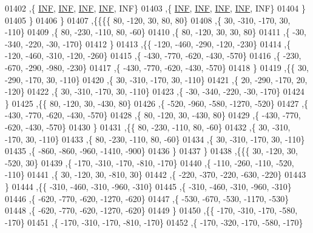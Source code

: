 \begin{DoxyCode}
01402     ,\{   \hyperlink{constants_8h_a12c2040f25d8e3a7b9e1c2024c618cb6}{INF},   \hyperlink{constants_8h_a12c2040f25d8e3a7b9e1c2024c618cb6}{INF},   \hyperlink{constants_8h_a12c2040f25d8e3a7b9e1c2024c618cb6}{INF},   \hyperlink{constants_8h_a12c2040f25d8e3a7b9e1c2024c618cb6}{INF},   INF\}
01403     ,\{   \hyperlink{constants_8h_a12c2040f25d8e3a7b9e1c2024c618cb6}{INF},   \hyperlink{constants_8h_a12c2040f25d8e3a7b9e1c2024c618cb6}{INF},   \hyperlink{constants_8h_a12c2040f25d8e3a7b9e1c2024c618cb6}{INF},   \hyperlink{constants_8h_a12c2040f25d8e3a7b9e1c2024c618cb6}{INF},   INF\}
01404     \}
01405    \}
01406   \}
01407  ,\{\{\{\{    80,  -120,    30,    80,    80\}
01408     ,\{    30,  -310,  -170,    30,  -110\}
01409     ,\{    80,  -230,  -110,    80,   -60\}
01410     ,\{    80,  -120,    30,    30,    80\}
01411     ,\{   -30,  -340,  -220,   -30,  -170\}
01412     \}
01413    ,\{\{  -120,  -460,  -290,  -120,  -230\}
01414     ,\{  -120,  -460,  -310,  -120,  -260\}
01415     ,\{  -430,  -770,  -620,  -430,  -570\}
01416     ,\{  -230,  -670,  -290,  -980,  -230\}
01417     ,\{  -430,  -770,  -620,  -430,  -570\}
01418     \}
01419    ,\{\{    30,  -290,  -170,    30,  -110\}
01420     ,\{    30,  -310,  -170,    30,  -110\}
01421     ,\{    20,  -290,  -170,    20,  -120\}
01422     ,\{    30,  -310,  -170,    30,  -110\}
01423     ,\{   -30,  -340,  -220,   -30,  -170\}
01424     \}
01425    ,\{\{    80,  -120,    30,  -430,    80\}
01426     ,\{  -520,  -960,  -580, -1270,  -520\}
01427     ,\{  -430,  -770,  -620,  -430,  -570\}
01428     ,\{    80,  -120,    30,  -430,    80\}
01429     ,\{  -430,  -770,  -620,  -430,  -570\}
01430     \}
01431    ,\{\{    80,  -230,  -110,    80,   -60\}
01432     ,\{    30,  -310,  -170,    30,  -110\}
01433     ,\{    80,  -230,  -110,    80,   -60\}
01434     ,\{    30,  -310,  -170,    30,  -110\}
01435     ,\{  -860,  -860,  -960, -1410,  -900\}
01436     \}
01437    \}
01438   ,\{\{\{    30,  -120,    30,  -520,    30\}
01439     ,\{  -170,  -310,  -170,  -810,  -170\}
01440     ,\{  -110,  -260,  -110,  -520,  -110\}
01441     ,\{    30,  -120,    30,  -810,    30\}
01442     ,\{  -220,  -370,  -220,  -630,  -220\}
01443     \}
01444    ,\{\{  -310,  -460,  -310,  -960,  -310\}
01445     ,\{  -310,  -460,  -310,  -960,  -310\}
01446     ,\{  -620,  -770,  -620, -1270,  -620\}
01447     ,\{  -530,  -670,  -530, -1170,  -530\}
01448     ,\{  -620,  -770,  -620, -1270,  -620\}
01449     \}
01450    ,\{\{  -170,  -310,  -170,  -580,  -170\}
01451     ,\{  -170,  -310,  -170,  -810,  -170\}
01452     ,\{  -170,  -320,  -170,  -580,  -170\}

\end{DoxyCode}
